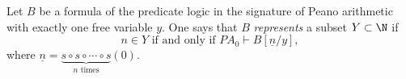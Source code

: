 

\setcounter{section}{3}
\setcounter{subsection}{4}
\setcounter{dfn}{30}

\begin{dfn}
Let $B$ be a formula of the predicate logic in the signature of Peano arithmetic with exactly one free variable $y$.
One says that $B$ \emph{represents} a subset $Y \subset \N$ if
\[
n \in Y \text{ if and only if }PA_0 \vdash B[\underline{n}/y],
\]
where $\underline{n} = \underbrace{s \circ s \circ \cdots \circ s}_{n\text{ times}}(0)$.
\end{dfn}

